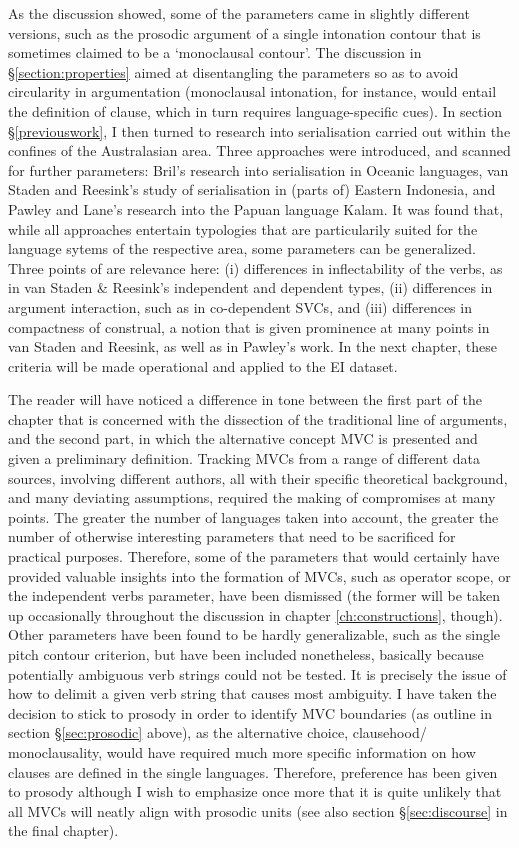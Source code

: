 As the discussion showed, some of the parameters came in slightly different versions, such as the prosodic argument of a single intonation contour that is sometimes claimed to be a `monoclausal contour'. The discussion in §\ref{section:properties} aimed at disentangling the parameters so as to avoid circularity in argumentation (monoclausal intonation, for instance, would entail the definition of clause, which in turn requires language-specific cues). In section §\ref{previouswork}, I then turned to research into serialisation carried out within the confines of the Australasian area. Three approaches were introduced, and scanned for further parameters: Bril's research into serialisation in Oceanic languages, van Staden and Reesink's study of serialisation in (parts of) Eastern Indonesia, and Pawley and Lane's research into the Papuan language Kalam. It was found that, while all approaches entertain typologies that are particularily suited for the language sytems of the respective area, some parameters can be generalized. Three points of are relevance here: (i) differences in inflectability of the verbs, as in van Staden \& Reesink's independent and dependent types, (ii) differences in argument interaction, such as in co-dependent SVCs, and (iii) differences in compactness of construal, a notion that is given prominence at many points in van Staden and Reesink, as well as in Pawley's work. In the next chapter, these criteria will be made operational and applied to the EI dataset.

The reader will have noticed a difference in tone between the first part of the chapter that is concerned with the dissection of the traditional line of arguments, and the second part, in which the alternative concept MVC is presented and given a preliminary definition. Tracking MVCs from a range of different data sources, involving different authors, all with their specific theoretical background, and many deviating assumptions, required the making of compromises at many points. The greater the number of languages taken into account, the greater the number of otherwise interesting parameters that need to be sacrificed for practical purposes. Therefore, some of the parameters that would certainly have provided valuable insights into the formation of MVCs, such as operator scope, or the independent verbs parameter, have been dismissed (the former will be taken up occasionally throughout the discussion in chapter \ref{ch:constructions}, though). Other parameters have been found to be hardly generalizable, such as the single pitch contour criterion, but have been included nonetheless, basically because potentially ambiguous verb strings could not be tested. It is precisely the issue of how to delimit a given verb string that causes most ambiguity. I have taken the decision to stick to prosody in order to identify MVC boundaries (as outline in section §\ref{sec:prosodic} above), as the alternative choice, clausehood/ monoclausality, would have required much more specific information on how clauses are defined in the single languages. Therefore, preference has been given to prosody although I wish to emphasize once more that it is quite unlikely that all MVCs will neatly align with prosodic units (see also section §\ref{sec:discourse} in the final chapter).

